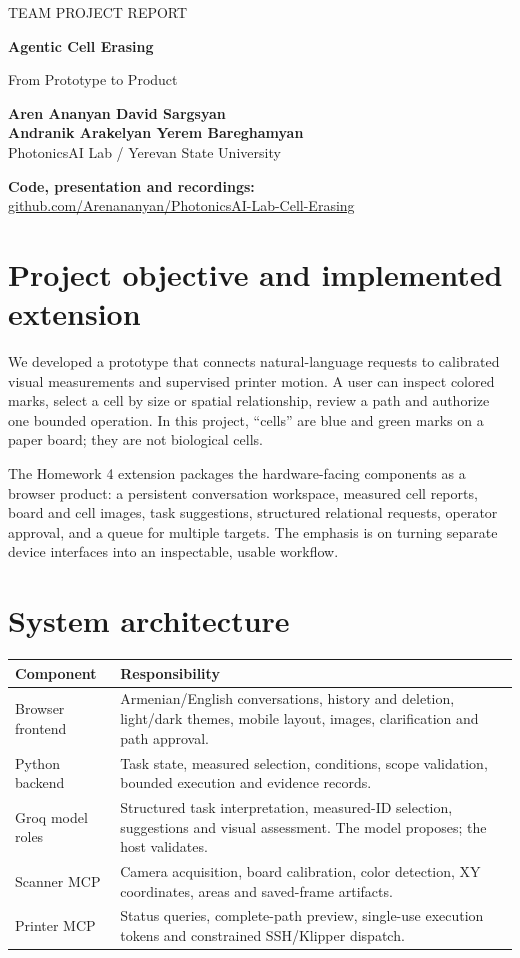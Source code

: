 \documentclass[10pt,a4paper]{article}
\newcommand{\repo}{https://github.com/Arenananyan/PhotonicsAI-Lab-Cell-Erasing}
\begin{document}
{\sffamily\color{muted}TEAM PROJECT REPORT\par}
{\Huge\sffamily\bfseries\color{labgreen}Agentic Cell Erasing\par}
{\Large\sffamily From Prototype to Product\par}
\vspace{5pt}
\textbf{Aren Ananyan \quad David Sargsyan}\\
\textbf{Andranik Arakelyan \quad Yerem Bareghamyan}\\
PhotonicsAI Lab / Yerevan State University

\textbf{Code, presentation and recordings:}\\
\href{\repo}{github.com/Arenananyan/PhotonicsAI-Lab-Cell-Erasing}

\section{Project objective and implemented extension}
We developed a prototype that connects natural-language requests to calibrated
visual measurements and supervised printer motion. A user can inspect colored
marks, select a cell by size or spatial relationship, review a path and authorize
one bounded operation. In this project, ``cells'' are blue and green marks on a
paper board; they are not biological cells.

The Homework 4 extension packages the hardware-facing components as a browser
product: a persistent conversation workspace, measured cell reports, board and
cell images, task suggestions, structured relational requests, operator approval,
and a queue for multiple targets. The emphasis is on turning separate device
interfaces into an inspectable, usable workflow.

\section{System architecture}
\begin{tabularx}{\linewidth}{@{}p{32mm}Y@{}}
\toprule
\textbf{Component} & \textbf{Responsibility}\\\midrule
Browser frontend & Armenian/English conversations, history and deletion, light/dark themes, mobile layout, images, clarification and path approval.\\
Python backend & Task state, measured selection, conditions, scope validation, bounded execution and evidence records.\\
Groq model roles & Structured task interpretation, measured-ID selection, suggestions and visual assessment. The model proposes; the host validates.\\
Scanner MCP & Camera acquisition, board calibration, color detection, XY coordinates, areas and saved-frame artifacts.\\
Printer MCP & Status queries, complete-path preview, single-use execution tokens and constrained SSH/Klipper dispatch.\\
\bottomrule
\end{tabularx}
\end{document}
